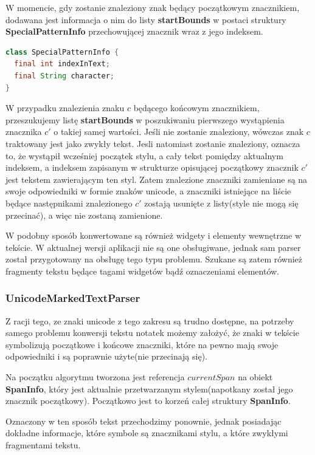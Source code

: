 W momencie, gdy zostanie znaleziony znak będący początkowym znacznikiem, dodawana jest informacja o nim do listy \textbf{startBounds} w postaci struktury \textbf{SpecialPatternInfo} przechowującej znacznik wraz z jego indeksem.

\begin{lstlisting}[language=Java]
class SpecialPatternInfo {
  final int indexInText;
  final String character;
}
\end{lstlisting}

W przypadku znalezienia znaku $c$ będącego końcowym znacznikiem, przeszukujemy listę \textbf{startBounds} w poszukiwaniu pierwszego wystąpienia znacznika $c'$ o takiej samej wartości. Jeśli nie zostanie znaleziony, wówczas znak $c$ traktowany jest jako zwykły tekst. Jesli natomiast zostanie znaleziony, oznacza to, że wystąpił wcześniej początek stylu, a cały tekst pomiędzy aktualnym indeksem, a indeksem zapisanym w strukturze opisującej początkowy znacznik $c'$ jest tekstem zawierającym ten styl. Zatem znalezione znaczniki zamieniane są na swoje odpowiedniki w formie znaków unicode, a znaczniki istniejące na liście będące następnikami znalezionego $c'$ zostają usunięte z listy(style nie mogą się przecinać), a więc nie zostaną zamienione.

W podobny sposób konwertowane są również widgety i elementy wewnętrzne w tekście. W aktualnej wersji aplikacji nie są one obsługiwane, jednak sam parser został przygotowany na obsługę tego typu problemu. Szukane są zatem również fragmenty tekstu będące tagami widgetów bądź oznaczeniami elementów.

\subsubsection{UnicodeMarkedTextParser}

Z racji tego, ze znaki unicode z tego zakresu są trudno dostępne, na potrzeby samego problemu konwersji tekstu notatek możemy założyć, że znaki w tekście symbolizują początkowe i końcowe znaczniki, które na pewno mają swoje odpowiedniki i są poprawnie użyte(nie przecinają się).

Na początku algorytmu tworzona jest referencja $currentSpan$ na obiekt \textbf{SpanInfo}, który jest aktualnie przetwarzanym stylem(napotkany został jego znacznik początkowy). Początkowo jest to korzeń całej struktury \textbf{SpanInfo}.

Oznaczony w ten sposób tekst przechodzimy ponownie, jednak posiadając dokładne informacje, które symbole są znacznikami stylu, a które zwykłymi fragmentami tekstu.

